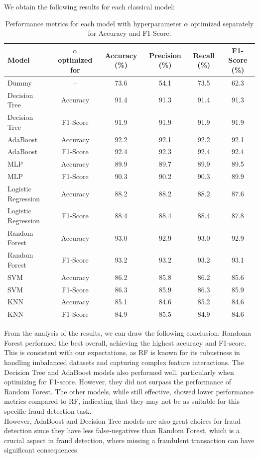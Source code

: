 \documentclass[10pt]{article}
\begin{document}
We obtain the following results for each classical model:
\begin{table}[H]
	\centering
	\begin{tabular}{|l|c|c|c|c|c|}
		\hline
		\textbf{Model} & \textbf{$\alpha$ optimized for} & \textbf{Accuracy (\%)} & \textbf{Precision (\%)} & \textbf{Recall (\%)} & \textbf{F1-Score (\%)} \\
		\hline
		Dummy & – & 73.6 & 54.1 & 73.5 & 62.3 \\
		\hline
		Decision Tree & Accuracy & 91.4 & 91.3 & 91.4 & 91.3 \\
		Decision Tree & F1-Score & 91.9 & 91.9 & 91.9 & 91.9 \\
		\hline
		AdaBoost & Accuracy & 92.2 & 92.1 & 92.2 & 92.1 \\
		AdaBoost & F1-Score & 92.4 & 92.3 & 92.4 & 92.4 \\
		\hline
		MLP & Accuracy & 89.9 & 89.7 & 89.9 & 89.5 \\
		MLP & F1-Score & 90.3 & 90.2 & 90.3 & 89.9 \\
		\hline
		Logistic Regression & Accuracy & 88.2 & 88.2 & 88.2 & 87.6 \\
		Logistic Regression & F1-Score & 88.4 & 88.4 & 88.4 & 87.8 \\
		\hline
		Random Forest & Accuracy & 93.0 & 92.9 & 93.0 & 92.9 \\
		Random Forest & F1-Score & 93.2 & 93.2 & 93.2 & 93.1 \\
		\hline
		SVM & Accuracy & 86.2 & 85.8 & 86.2 & 85.6 \\
		SVM & F1-Score & 86.3 & 85.9 & 86.3 & 85.9 \\
		\hline
		KNN & Accuracy & 85.1 & 84.6 & 85.2 & 84.6 \\
		KNN & F1-Score & 84.9 & 85.5 & 84.9 & 84.6 \\
		\hline
	\end{tabular}
	\caption{Performance metrics for each model with hyperparameter $\alpha$ optimized separately for Accuracy and F1-Score.}
\end{table}
\noindent From the analysis of the results, we can draw the following conclusion: Randoma Forest performed the best overall, achieving the highest accuracy and F1-score. This is consistent with our expectations, as RF is known for its robustness in handling imbalanced datasets and capturing complex feature interactions. The Decision Tree and AdaBoost models also performed well, particularly when optimizing for F1-score. However, they did not surpass the performance of Random Forest. The other models, while still effective, showed lower performance metrics compared to RF, indicating that they may not be as suitable for this specific fraud detection task.\\
However, AdaBoost and Decision Tree models are also great choices for fraud detection since they have less false-negatives than Random Forest, which is a crucial aspect in fraud detection, where missing a fraudulent transaction can have significant consequences.\\
\end{document}
